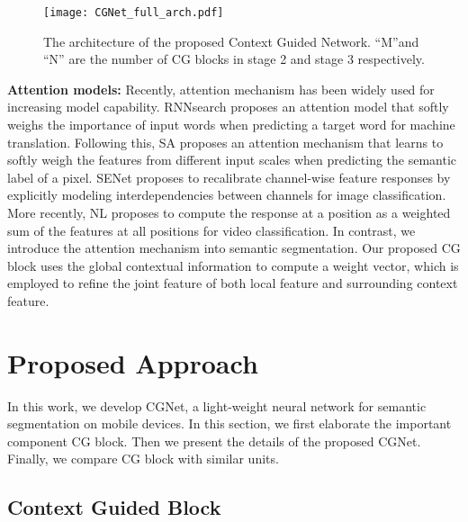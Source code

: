 \documentclass[10pt,twocolumn,letterpaper]{article}
\begin{document}
\begin{figure*}[t]
\centering
\texttt{[image: CGNet\_full\_arch.pdf]}
\caption{The architecture of the proposed Context Guided Network. ``M''and ``N'' are the number of CG blocks in stage 2 and stage 3 respectively.}
\label{fig:fig4}
\vspace{-15pt}
\end{figure*}



\textbf{Attention models:}\quad
Recently, attention mechanism has been widely used for increasing model capability. RNNsearch \cite{bahdanau2014neural} proposes an attention model that softly weighs the importance of input words when predicting a target word for machine translation. Following this, SA \cite{chen2016attention} proposes an attention mechanism that learns to softly weigh the features from different input scales when predicting the semantic label of a pixel. SENet \cite{hu2017squeeze} proposes to recalibrate channel-wise feature responses by explicitly modeling interdependencies between channels for image classification. More recently, NL \cite{wang2018non} proposes to compute the response at a position as a weighted sum of the features at all positions for video classification. In contrast, we introduce the attention mechanism into semantic segmentation. Our proposed CG block uses the global contextual information to compute a weight vector, which is employed to refine the joint feature of both local feature and surrounding context feature.





\section{Proposed Approach}
In this work, we develop CGNet, a light-weight neural network for semantic segmentation on mobile devices. In this section, we first elaborate the important component CG block. Then we present the details of the proposed CGNet. Finally, we compare CG block with similar units.



\subsection{Context Guided Block}
\end{document}
